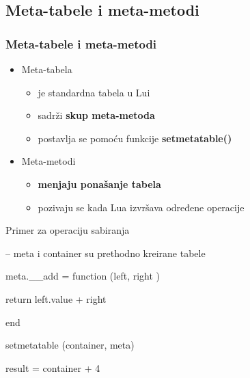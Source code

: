 \documentclass{beamer}
\begin{document}
\subsection{Meta-tabele i meta-metodi}
\begin{frame}
\frametitle{Meta-tabele i meta-metodi}
\begin{itemize}
\item Meta-tabela
\begin{itemize}
\item je standardna tabela u Lui
\item sadrži \textbf{skup meta-metoda}
\item postavlja se pomoću funkcije \textbf{setmetatable()}
\end{itemize}
\item Meta-metodi
\begin{itemize}
\item \textbf{menjaju ponašanje tabela}
\item pozivaju se kada Lua izvršava određene operacije %
\end{itemize}
\end{itemize}

\begin{block}{Primer za operaciju sabiranja}

\begin{semiverbatim}
-- meta i container su prethodno kreirane tabele

meta.\_\_add = function (left, right )

               \quad return left.value + right

               end


setmetatable (container, meta)

result = container + 4

\end{semiverbatim}
\end{block}

\end{frame}

\end{document}
